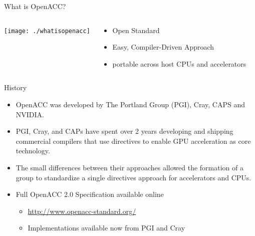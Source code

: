 \documentclass[10pt,t]{beamer}
\begin{document}
\begin{frame}[allowframebreaks]{What is OpenACC?}
  \begin{columns}
  \begin{center}
    \texttt{[image: ./whatisopenacc]}
  \end{center}
  \begin{block}{}
    \begin{itemize}
      \item Open Standard
      \item Easy, Compiler-Driven Approach
      \item portable across host CPUs and accelerators
    \end{itemize}
  \end{block}
  \end{columns}	

  \framebreak

  \begin{exampleblock}{History}
    \begin{itemize}
    \item OpenACC was developed by The Portland Group (PGI), Cray, CAPS and NVIDIA. 
    \item PGI, Cray, and CAPs have spent over 2 years developing and shipping commercial compilers that use directives to enable GPU acceleration as core technology. 
    \item The small differences between their approaches allowed the formation of a group to standardize a single directives approach for accelerators and CPUs.
    \item Full OpenACC 2.0 Specification available online 
      \begin{itemize}
      \item \url{http://www.openacc-standard.org/}
      \item Implementations available now from PGI and Cray
      \end{itemize}
    \end{itemize}
  \end{exampleblock}


\end{frame}
\end{document}
